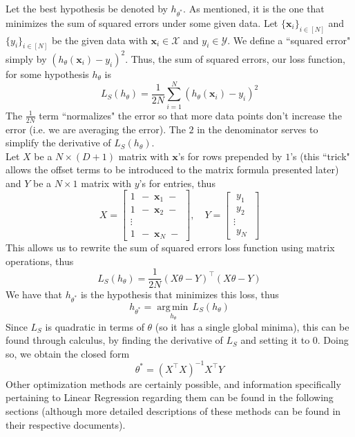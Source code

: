 \documentclass[12pt]{article}
\newcommand{\argmin}[1]{\underset{#1}{\operatorname{arg\,min\,}}}
\begin{document}
Let the best hypothesis be denoted by $h_{\theta^*}$. As mentioned, it is the one that minimizes the sum of squared errors under some given data. Let $\{\mathbf{x}_i\}_{i\in[N]}$ and $\{y_i\}_{i\in[N]}$ be the given data with $\mathbf{x}_i \in \mathcal{X}$ and $y_i \in \mathcal{Y}$. We define a ``squared error"  simply by $(h_\theta(\mathbf{x}_i) - y_i)^2$. Thus, the sum of squared errors, our loss function, for some hypothesis $h_\theta$ is
\[ L_S(h_\theta) = \frac{1}{2N}\sum_{i=1}^{N}(h_\theta(\mathbf{x}_i) - y_i)^2 \]
The $\frac{1}{2N}$ term ``normalizes" the error so that more data points don't increase the error (i.e. we are averaging the error). The $2$ in the denominator serves to simplify the derivative of $L_S(h_\theta)$.
\\\newline
Let $X$ be a $N{\times}(D+1)$ matrix with $\mathbf{x}$'s for rows prepended by $1$'s (this ``trick" allows the offset terms to be introduced to the matrix formula presented later)  and $Y$ be a $N{\times}1$ matrix with $y$'s for entries, thus
\[
	X =
	\begin{bmatrix}
		1 \;\, - \; \mathbf{x}_1 \; - \\
		1 \;\, - \; \mathbf{x}_2 \; - \\
		\vdots \\
		1 \;\, - \; \mathbf{x}_N \; -
	\end{bmatrix}
	, \quad
	Y =
	\begin{bmatrix}
		\; y_1 \; \\
		\; y_2 \; \\
		\vdots \\
		\; y_N \;
	\end{bmatrix}
\]
This allows us to rewrite the sum of squared errors loss function using matrix operations, thus
\[ L_S(h_\theta) = \frac{1}{2N}(X\theta - Y)^\top(X\theta - Y) \]
We have that $h_{\theta^*}$ is the hypothesis that minimizes this loss, thus
\[ h_{\theta^*} = \argmin{h_\theta}L_S(h_\theta) \]
\newpage
\noindent
Since $L_S$ is quadratic in terms of $\theta$ (so it has a single global minima), this can be found through calculus, by finding the derivative of $L_S$ and setting it to $0$. Doing so, we obtain the closed form
\[ \theta^* = (X^\top X)^{-1} X^\top Y \]
Other optimization methods are certainly possible, and information specifically pertaining to Linear Regression regarding them can be found in the following sections (although more detailed descriptions of these methods can be found in their respective documents).
\end{document}
